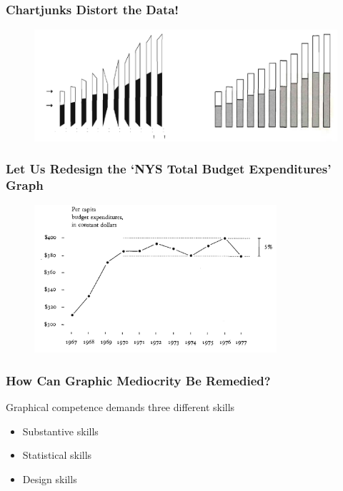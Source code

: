 \documentclass[aspectratio=1610]{beamer}
\begin{document}
\begin{frame}
	\frametitle{Chartjunks Distort the Data!}
	\begin{figure}
		\begin{small}
			\begin{center}
				\includegraphics[width=1\textwidth]{
					images/errors_.png
				}
			\end{center}
		\end{small}
	\end{figure}
\end{frame}

\begin{frame}
	\frametitle{Let Us Redesign the `NYS Total Budget Expenditures' Graph}
	\begin{figure}
		\begin{small}
			\begin{center}
				\includegraphics[width=0.8\textwidth]{
					images/redo_nys_budget.png
				}
			\end{center}
		\end{small}
	\end{figure}
\end{frame}

\begin{frame}
	\frametitle{How Can Graphic Mediocrity Be Remedied?}
	Graphical competence demands three different skills

	\begin{itemize}
		\item Substantive skills
		\item Statistical skills
		\item Design skills
	\end{itemize}
\end{frame}
\end{document}
